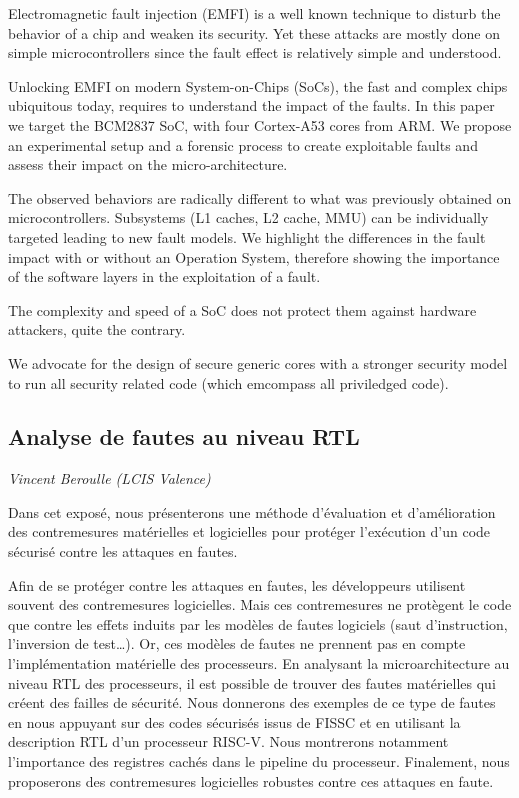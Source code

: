 \documentclass[a4paper,11pt]{article}
\begin{document}
Electromagnetic fault injection (EMFI) is a well known technique to disturb the behavior of a chip and
weaken its security. Yet these attacks are mostly done on simple
microcontrollers since the fault effect is relatively simple and understood.

Unlocking EMFI on modern System-on-Chips (SoCs), the fast and complex chips
ubiquitous today, requires to understand the impact of the faults. In this
paper we target the BCM2837 SoC, with four Cortex-A53 cores from ARM. We
propose an experimental setup and a forensic process to create exploitable
faults and assess their impact on the micro-architecture.

The observed behaviors are radically different to what was previously obtained
on microcontrollers. Subsystems (L1 caches, L2 cache, MMU) can be
individually targeted leading to new fault models. We highlight the
differences in the fault impact with or without an Operation System, therefore showing
the importance of the software layers in the exploitation of a fault.

The complexity and speed of a SoC does not protect them against hardware
attackers, quite the contrary.

We advocate for the design of secure generic cores with a stronger security
model to run all security related code (which emcompass all priviledged code).

\subsection{Analyse de fautes au niveau RTL}
\label{sec:org4193ecc}
\emph{Vincent Beroulle (LCIS Valence)}

Dans cet exposé, nous présenterons une méthode d’évaluation et
d’amélioration des contremesures matérielles et logicielles pour
protéger l’exécution d’un code sécurisé contre les attaques en fautes.

Afin de se protéger contre les attaques en fautes, les développeurs
utilisent souvent des contremesures logicielles. Mais ces
contremesures ne protègent le code que contre les effets induits par
les modèles de fautes logiciels (saut d’instruction, l’inversion de
test\ldots{}). Or, ces modèles de fautes ne prennent pas en compte
l’implémentation matérielle des processeurs. En analysant la
microarchitecture au niveau RTL des processeurs, il est possible de
trouver des fautes matérielles qui créent des failles de
sécurité. Nous donnerons des exemples de ce type de fautes en nous
appuyant sur des codes sécurisés issus de FISSC et en utilisant la
description RTL d’un processeur RISC-V. Nous montrerons notamment
l’importance des registres cachés dans le pipeline du
processeur. Finalement, nous proposerons des contremesures logicielles
robustes contre ces attaques en faute.
\end{document}
